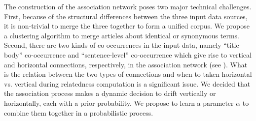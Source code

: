 

The construction of the association network poses two
major technical challenges.
First, because of the structural differences between the three input
data sources, it is non-trivial to merge the three together to form
a unified corpus. We propose a clustering algorithm to merge articles about
identical or synonymous terms.
Second, there are two kinds of co-occurrences in the input data,
namely ``title-body'' co-occurrence and ``sentence-level'' co-occurrence which
give rise to vertical and horizontal connections, respectively,
in the association network (see ).
What is the relation between the two types of connections and
when to taken horizontal vs. vertical during relatedness computation
is a significant issue. We decided that the association process
makes a dynamic decision to drift vertically or horizontally,
each with a prior probability. We propose to learn a parameter
$\alpha$ to combine them together in a probabilistic process.

